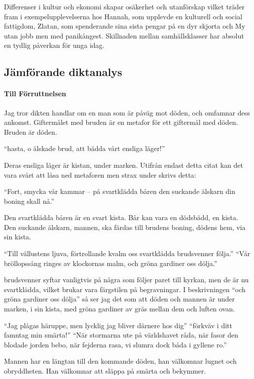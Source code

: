 Differenser i kultur och ekonomi skapar osäkerhet och utanförskap vilket träder fram i exempelupplevelserna hos Hannah, som upplevde en kulturell och social fattigdom, Zlatan, som spenderande sina sista pengar på en dyr skjorta och My utan jobb men med panikångest. Skillnaden mellan samhällsklasser har absolut en tydlig påverkan för unga idag.

\newpage
\subsection{Jämförande diktanalys}

\paragraph{Till Förruttnelsen}

Jag tror dikten handlar om en man som är påväg mot döden, och omfamnar dess ankomst. Giftermålet med bruden är en metafor för ett giftermål med döden. Bruden är döden.

“hasta, o älskade brud, att bädda vårt ensliga läger!”

Deras ensliga läger är kistan, under marken. Utifrån endast detta citat kan det vara svårt att låsa ned metaforen men strax under skrivs detta:

“Fort, smycka vår kammar -- på svartklädda båren den suckande älskarn din boning skall nå.”

Den svartklädda båren är en svart kista. Bår kan vara en dödsbädd, en kista. Den suckande älskarn, mannen, ska färdas till brudens boning, dödens hem, via sin kista.

“Till vällustens ljuva, förtrollande kvalm oss svartklädda brudsvenner följa.”
“Vår bröllopssång ringes av klockornas malm, och gröna gardiner oss dölja.”

brudsvenner syftar vanligtvis på några som följer paret till kyrkan, men de är nu svartklädda, vilket brukar vara färgstilen på begravningar. I beskrivningen “och gröna gardiner oss dölja” så ser jag det som att döden och mannen är under marken, i sin kista, med gröna gardiner av gräs mellan dem och luften ovan.

“Jag plågas häruppe, men lycklig jag bliver därnere hos dig”
“förkväv i ditt famntag min smärta!”
“När stormarna ute på världshavet råda, när fasor den blodade jorden bebo, när fejderna rasa, vi slumra dock båda i gyllene ro.”

Mannen har en längtan till den kommande döden, han välkomnar lugnet och obryddheten. Han välkomnar att släppa på smärta och bekymmer.

